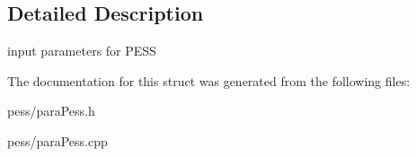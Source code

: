 \subsection{Detailed Description}
input parameters for P\+E\+SS 

The documentation for this struct was generated from the following files\+:\begin{DoxyCompactItemize}
\item 
pess/para\+Pess.\+h\item 
pess/para\+Pess.\+cpp\end{DoxyCompactItemize}
